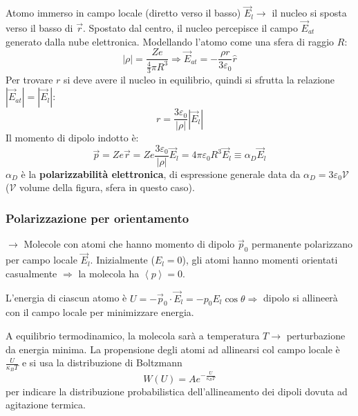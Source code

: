 \documentclass[a4paper]{scrartcl}
\numberwithin{equation}{subsection}
\theoremstyle{style1}
\begin{document}
Atomo immerso in campo locale (diretto verso il basso) $\vec{E}_l \to$ il nucleo si sposta verso il basso di $\vec{r}$. Spostato dal centro, il nucleo percepisce il campo $\vec{E}_{at} $ generato dalla nube elettronica. Modellando l'atomo come una sfera di raggio $R$:
\begin{equation}
	|\rho| = \frac{Ze}{\frac{4}{3}\pi R^3} \Rightarrow \vec{E}_{at} = -\frac{\rho  r}{3 \varepsilon _0} \hat{r}
\end{equation}
Per trovare $r$ si deve avere il nucleo in equilibrio, quindi si sfrutta la relazione $\left\lvert \vec{E}_{at}  \right\rvert = \left\lvert \vec{E}_l \right\rvert$:
\begin{equation}
	r=\frac{3\varepsilon_0}{|\rho| }\left\lvert \vec{E}_l \right\rvert 
\end{equation}
Il momento di dipolo indotto \`e:
\begin{equation}
	\vec{p}=Ze \vec{r}= Ze \frac{3\varepsilon _0}{|\rho |}\vec{E}_l = 4\pi \varepsilon _0 R^3 \vec{E}_l\equiv \alpha _D \vec{E}_l
\end{equation}
$\alpha _D$ \`e la \textbf{polarizzabilit\`a elettronica}, di espressione generale data da $\alpha _D = 3 \varepsilon _0 \mathcal{V}$ ($\mathcal{V} $ volume della figura, sfera in questo caso).

\subsubsection{Polarizzazione per orientamento}

$\to$ Molecole con atomi che hanno momento di dipolo $\vec{p}_0$ permanente polarizzano per campo locale $\vec{E}_l$. Inizialmente ($E_l = 0$), gli atomi hanno momenti orientati casualmente $\Rightarrow $ la molecola ha $\left\langle p \right\rangle=0$.

L'energia di ciascun atomo \`e $U = - \vec{p}_0 \cdot \vec{E}_l = - p_0E_l \cos \theta \Rightarrow $ dipolo si allineerà con il campo locale per minimizzare energia.

A equilibrio termodinamico, la molecola sar\`a a temperatura $T\to$ perturbazione da energia minima. La propensione degli atomi ad allinearsi col campo locale \`e $\frac{U}{\kappa _B T}$ e si usa la distribuzione di Boltzmann 
\begin{equation}
	W(U) = A e^{-\frac{U}{\kappa _B T}} 
\end{equation}
per indicare la distribuzione probabilistica dell'allineamento dei dipoli dovuta ad agitazione termica.
\end{document}
